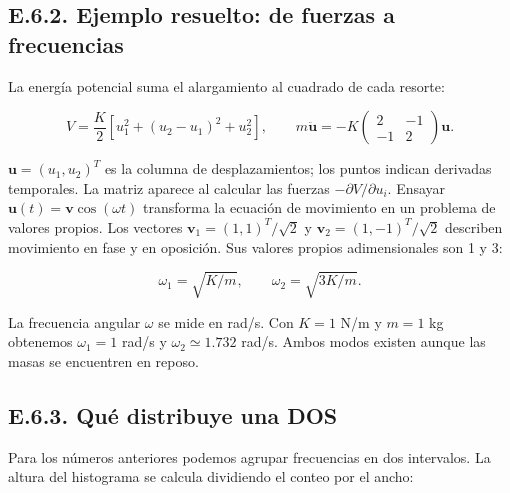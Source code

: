 \documentclass[
  spanish,
  10pt,
  a4paper,
]{article}
\begin{document}
\subsection{E.6.2. Ejemplo resuelto: de fuerzas a
frecuencias}\label{e.6.2.-ejemplo-resuelto-de-fuerzas-a-frecuencias}

La energía potencial suma el alargamiento al cuadrado de cada resorte:

\[
V=\frac K2[u_1^2+(u_2-u_1)^2+u_2^2],\qquad
m\ddot{\mathbf u}=-K\begin{pmatrix}2&-1\\-1&2\end{pmatrix}\mathbf u.
\tag{E.13}
\]

\(\mathbf u=(u_1,u_2)^T\) es la columna de desplazamientos; los puntos
indican derivadas temporales. La matriz aparece al calcular las fuerzas
\(-\partial V/\partial u_i\). Ensayar
\(\mathbf u(t)=\mathbf v\cos(\omega t)\) transforma la ecuación de
movimiento en un problema de valores propios. Los vectores
\(\mathbf v_1=(1,1)^T/\sqrt2\) y \(\mathbf v_2=(1,-1)^T/\sqrt2\)
describen movimiento en fase y en oposición. Sus valores propios
adimensionales son 1 y 3:

\[
\omega_1=\sqrt{K/m},\qquad \omega_2=\sqrt{3K/m}.
\tag{E.14}
\]

La frecuencia angular \(\omega\) se mide en rad/s. Con \(K=1\) N/m y
\(m=1\) kg obtenemos \(\omega_1=1\) rad/s y \(\omega_2\simeq1.732\)
rad/s. Ambos modos existen aunque las masas se encuentren en reposo.

\subsection{E.6.3. Qué distribuye una
DOS}\label{e.6.3.-quuxe9-distribuye-una-dos}

Para los números anteriores podemos agrupar frecuencias en dos
intervalos. La altura del histograma se calcula dividiendo el conteo por
el ancho:
\end{document}
